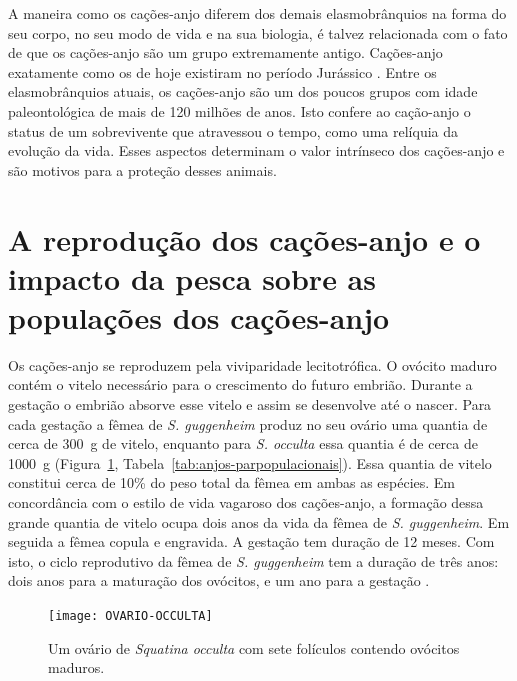 \documentclass[a4paper,11pt,twoside,showtrims,onecolumn,openright,final]{memoir}
\begin{document}

A maneira como os cações-anjo diferem dos demais elasmobrânquios na forma do seu corpo, 
no seu modo de vida e na sua biologia, é talvez relacionada com o fato de que os cações-anjo 
são um grupo extremamente antigo. Cações-anjo exatamente como os de hoje existiram 
no período Jurássico \citep{cappetta1987}. %
Entre os elasmobrânquios atuais, os cações-anjo são um dos poucos grupos com idade paleontológica 
de mais de 120 milhões de anos. Isto confere ao cação-anjo o status de um sobrevivente que 
atravessou o tempo, como uma relíquia da evolução da vida. Esses aspectos determinam o valor 
intrínseco dos cações-anjo e são motivos para a proteção desses animais.  

\section*{A reprodução dos cações-anjo e o impacto da pesca sobre as populações dos cações-anjo}

Os cações-anjo se reproduzem pela viviparidade lecitotrófica. O ovócito maduro  contém o vitelo 
necessário para o crescimento do futuro embrião. Durante a gestação o embrião absorve esse vitelo 
e assim se desenvolve até o nascer. Para cada gestação a fêmea de \emph{S. guggenheim} produz no seu 
ovário uma quantia de cerca de 300~g de vitelo, enquanto para \emph{S. occulta} 
essa quantia é de cerca de 1000~g (Figura~\ref{fig:anjos-ovario-occulta}, Tabela~\ref{tab:anjos-parpopulacionais}). %
Essa quantia de vitelo constitui cerca de 10\% do peso total da fêmea em ambas as espécies. 
Em concordância com o estilo de vida vagaroso dos cações-anjo, a formação dessa grande quantia 
de vitelo ocupa dois anos da vida da fêmea de \emph{S. guggenheim}. Em seguida a fêmea copula e engravida. 
A gestação tem duração de 12 meses. Com isto, o ciclo reprodutivo da fêmea de \emph{S. guggenheim} tem 
a duração de três anos: dois anos para a maturação dos ovócitos, e um ano para a gestação \citep{silva1996}. %

%
%

\begin{figure}
\begin{center}
\texttt{[image: OVARIO-OCCULTA]}
\end{center}
\caption[Ovário de \emph{Squatina occulta}]
	{Um ovário de \emph{Squatina occulta} com sete folículos contendo ovócitos maduros.}
\label{fig:anjos-ovario-occulta}
\end{figure}
\end{document}
